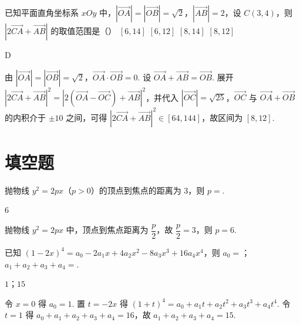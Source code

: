 \begin{problem}
已知平面直角坐标系 \(xOy\) 中，\(|\overrightarrow{OA}|=|\overrightarrow{OB}|=\sqrt2\)，\(|\overrightarrow{AB}|=2\)，设 \(C(3,4)\)，则 \(|2\overrightarrow{CA}+\overrightarrow{AB}|\) 的取值范围是（\quad）
\choices
    {\([6,14]\)}
    {\([6,12]\)}
    {\([8,14]\)}
    {\([8,12]\)}
\end{problem}

\begin{answer}
D
\end{answer}

\begin{solution}
由 \(|\overrightarrow{OA}|=|\overrightarrow{OB}|=\sqrt2\)，\(\overrightarrow{OA}\cdot\overrightarrow{OB}=0\). 设 \(\overrightarrow{OA}+\overrightarrow{AB}=\overrightarrow{OB}\). 展开 \(|2\overrightarrow{CA}+\overrightarrow{AB}|^2 =|2(\overrightarrow{OA}-\overrightarrow{OC})+\overrightarrow{AB}|^2\)，并代入 \(|\overrightarrow{OC}|=\sqrt{25}\)，\(\overrightarrow{OC}\) 与 \(\overrightarrow{OA}+\overrightarrow{OB}\) 的内积介于 \(\pm10\) 之间，可得 \(|2\overrightarrow{CA}+\overrightarrow{AB}|^2\in[64,144]\)，故区间为 \([8,12]\).
\end{solution}
\section{填空题}

\begin{problem}
抛物线 \(y^2=2px\)（\(p>0\)）的顶点到焦点的距离为 3，则 \(p=\)\fillinblank{}.
\end{problem}

\begin{answer}
6
\end{answer}

\begin{solution}
抛物线 \(y^2=2px\) 中，顶点到焦点距离为 \(\dfrac p2\)，故 \(\dfrac p2=3\)，则 \(p=6\).
\end{solution}

\begin{problem}
已知 \((1-2x)^4=a_0-2a_1x+4a_2x^2-8a_3x^3+16a_4x^4\)，则 \(a_0=\)；\(a_1+a_2+a_3+a_4=\)\fillinblank{}.
\end{problem}

\begin{answer}
\(1\)；\(15\)
\end{answer}

\begin{solution}
令 \(x=0\) 得 \(a_0=1\). 置 \(t=-2x\) 得 \((1+t)^4=a_0+a_1t+a_2t^2+a_3t^3+a_4t^4\). 令 \(t=1\) 得 \(a_0+a_1+a_2+a_3+a_4=16\)，故 \(a_1+a_2+a_3+a_4=15\).
\end{solution}

